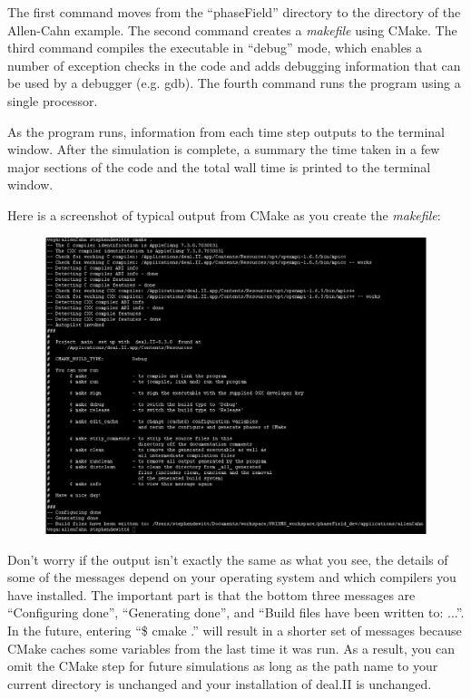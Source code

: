 \documentclass[10pt]{article} %
\begin{document}
The first command moves from the ``phaseField'' directory to the directory of the Allen-Cahn example. The second command creates a \emph{makefile} using CMake. The third command compiles the executable in ``debug'' mode, which enables a number of exception checks in the code and adds debugging information that can be used by a debugger (e.g. gdb). The fourth command runs the program using a single processor.

As the program runs, information from each time step outputs to the terminal window. After the simulation is complete, a summary the time taken in a few major sections of the code and the total wall time is printed to the terminal window. 

Here is a screenshot of typical output from CMake as you create the \emph{makefile}:
\begin{figure}[H]
\vspace{0pt}
\hspace{-2cm}
\includegraphics[width=1.3\textwidth,trim={0 0 3cm 0},clip]{cmake_output}
\vspace{0pt}
\end{figure}
Don't worry if the output isn't exactly the same as what you see, the details of some of the messages depend on your operating system and which compilers you have installed. The important part is that the bottom three messages are ``Configuring done'', ``Generating done'', and ``Build files have been written to: ...''. In the future, entering ``\$ cmake .'' will result in a shorter set of messages because CMake caches some variables from the last time it was run. As a result, you can omit the CMake step for future simulations as long as the path name to your current directory is unchanged and your installation of deal.II is unchanged.
\end{document}
